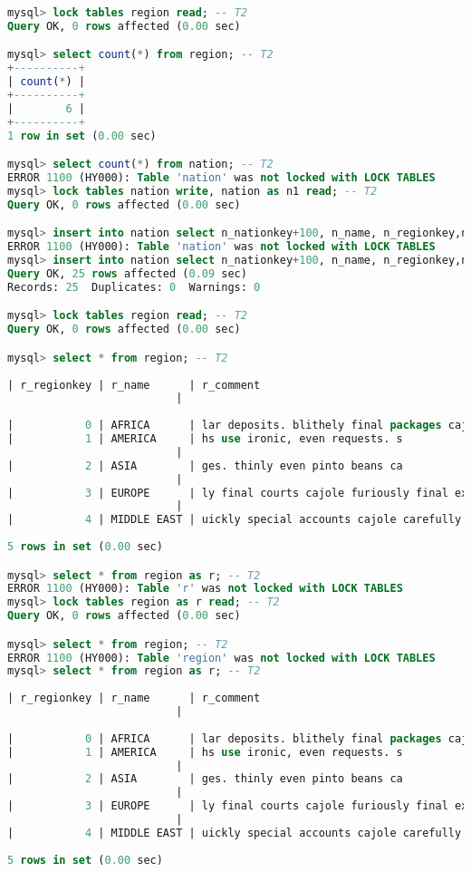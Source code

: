 \documentclass{article}
\begin{document}
\begin{lstlisting}[language=sql]
mysql> lock tables region read; -- T2
Query OK, 0 rows affected (0.00 sec)

mysql> select count(*) from region; -- T2
+----------+
| count(*) |
+----------+
|        6 |
+----------+
1 row in set (0.00 sec)

mysql> select count(*) from nation; -- T2
ERROR 1100 (HY000): Table 'nation' was not locked with LOCK TABLES
mysql> lock tables nation write, nation as n1 read; -- T2
Query OK, 0 rows affected (0.00 sec)

mysql> insert into nation select n_nationkey+100, n_name, n_regionkey,n_comment from nation; -- T2;
ERROR 1100 (HY000): Table 'nation' was not locked with LOCK TABLES
mysql> insert into nation select n_nationkey+100, n_name, n_regionkey,n_comment from nation as n1; -- T2;
Query OK, 25 rows affected (0.09 sec)
Records: 25  Duplicates: 0  Warnings: 0

mysql> lock tables region read; -- T2
Query OK, 0 rows affected (0.00 sec)

mysql> select * from region; -- T2
    
| r_regionkey | r_name      | r_comment
                          |
    
|           0 | AFRICA      | lar deposits. blithely final packages cajole. regular waters are final requests. regular accounts are according to  |
|           1 | AMERICA     | hs use ironic, even requests. s
                          |
|           2 | ASIA        | ges. thinly even pinto beans ca
                          |
|           3 | EUROPE      | ly final courts cajole furiously final excuse
                          |
|           4 | MIDDLE EAST | uickly special accounts cajole carefully blithely close requests. carefully final asymptotes haggle furiousl        |
    
5 rows in set (0.00 sec)

mysql> select * from region as r; -- T2
ERROR 1100 (HY000): Table 'r' was not locked with LOCK TABLES
mysql> lock tables region as r read; -- T2
Query OK, 0 rows affected (0.00 sec)

mysql> select * from region; -- T2
ERROR 1100 (HY000): Table 'region' was not locked with LOCK TABLES
mysql> select * from region as r; -- T2
    
| r_regionkey | r_name      | r_comment
                          |
    
|           0 | AFRICA      | lar deposits. blithely final packages cajole. regular waters are final requests. regular accounts are according to  |
|           1 | AMERICA     | hs use ironic, even requests. s
                          |
|           2 | ASIA        | ges. thinly even pinto beans ca
                          |
|           3 | EUROPE      | ly final courts cajole furiously final excuse
                          |
|           4 | MIDDLE EAST | uickly special accounts cajole carefully blithely close requests. carefully final asymptotes haggle furiousl        |
    
5 rows in set (0.00 sec)
\end{lstlisting}
\end{document}
